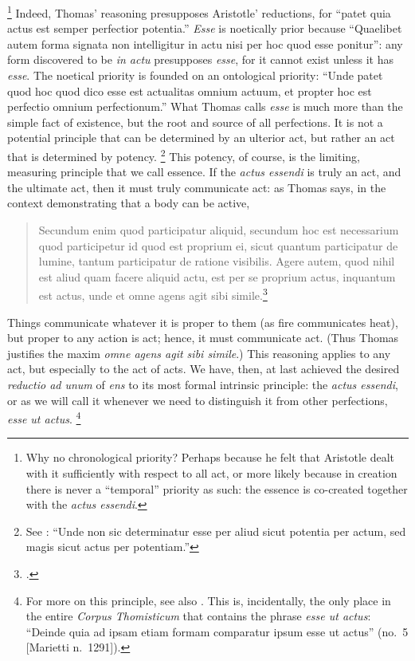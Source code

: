 %
\footnote{Why no chronological priority? Perhaps because he felt that Aristotle dealt with it sufficiently with respect to all act, or more likely because in creation there is never a “temporal” priority as such: the essence is co-created together with the \emph{actus essendi}.}
%
Indeed, Thomas’ reasoning presupposes Aristotle’ reductions, for “patet quia actus est semper perfectior potentia.” \emph{Esse} is noetically prior because “Quaelibet autem forma signata non intelligitur in actu nisi per hoc quod esse ponitur”: any form discovered to be \emph{in actu} presupposes \emph{esse}, for it cannot exist unless it has \emph{esse}. The noetical priority is founded on an ontological priority: “Unde patet quod hoc quod dico esse est actualitas omnium actuum, et propter hoc est perfectio omnium perfectionum.” What Thomas calls \emph{esse} is much more than the simple fact of existence, but the root and source of all perfections. It is not a potential principle that can be determined by an ulterior act, but rather an act that is determined by potency.%
%
\footnote{See \cite[q.~7, a.~2 ad~9]{st:depotentia}: “Unde non sic determinatur esse per aliud sicut potentia per actum, sed magis sicut actus per potentiam.”} This potency, of course, is the limiting, measuring principle that we call essence. If the \emph{actus essendi} is truly an act, and the ultimate act, then it must truly communicate act: as Thomas says, in the context demonstrating that a body can be active,
%
\begin{quotation}
Secundum enim quod participatur aliquid, secundum hoc est necessarium quod participetur id quod est proprium ei, sicut quantum participatur de lumine, tantum participatur de ratione visibilis. Agere autem, quod nihil est aliud quam facere aliquid actu, est per se proprium actus, inquantum est actus, unde et omne agens agit sibi simile.\footcite[I, q.~115, a.~1, co.]{st:summa}
\end{quotation}
%
Things communicate whatever it is proper to them (as fire communicates heat), but proper to any action is act; hence, it must communicate act. (Thus Thomas justifies the maxim \emph{omne agens agit sibi simile}.) This reasoning applies to any act, but especially to the act of acts. We have, then, at last achieved the desired \emph{reductio ad unum} of \emph{ens} to its most formal intrinsic principle: the \emph{actus essendi}, or as we will call it whenever we need to distinguish it from other perfections, \emph{esse ut actus}.%
%
\footnote{For more on this principle, see also \cite[II, cap.~54]{st:contragent}. This is, incidentally, the only place in the entire \emph{Corpus Thomisticum} that contains the phrase \emph{esse ut actus}: “Deinde quia ad ipsam etiam formam comparatur ipsum esse ut actus” (no.~5 [Marietti n.~1291]).}
%

